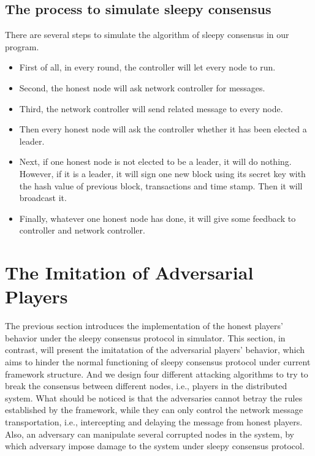 \documentclass{llncs}
\begin{document}
\subsection{The process to simulate sleepy consensus}
There are several steps to simulate the algorithm of sleepy consensus in our program.
\begin{itemize}
	\item First of all, in every round, the controller will 	let every node to run.\\
	\item Second, the honest node will ask network controller for messages.\\
	\item Third, the network controller will send related message to every node.\\
	\item Then every honest node will ask the controller whether it  has been elected a leader.\\
	\item Next, if one honest node is not elected to be a leader, it will do nothing. However, if it is a leader, it will sign one new block using its secret key with the hash value of previous block, transactions and time stamp. Then it will broadcast it.\\
	\item Finally, whatever one honest node has done, it will give some feedback to controller and network controller.\\
\end{itemize}
%
\section{The Imitation of Adversarial Players}
\quad The previous section introduces the implementation of the honest players' behavior under the sleepy consensus protocol in simulator. This section, in contrast, will present the imitatation of the adversarial players' behavior, which aims to hinder the normal functioning of sleepy consensus protocol under current framework structure. And we design four different attacking algorithms to try to break the consensus between different nodes, i.e., players in the distributed system. What should be noticed is that the adversaries cannot betray the rules established by the framework, while they can only control the network message transportation, i.e., intercepting and delaying the message from honest players. Also, an adversary can manipulate several corrupted nodes in the system, by which adversary impose damage to the system under sleepy consensus protocol.
\end{document}

